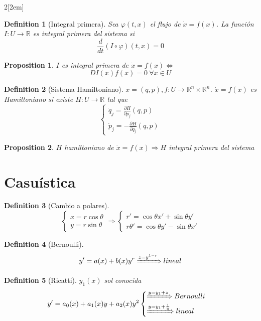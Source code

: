\documentclass[leqno]{article}
\newtheorem*{definition}{Definition}
\newtheorem*{proposition}{Proposition}
\begin{document}
\begin{multicols}{2}[\columnsep2em]
\begin{definition}[Integral primera] Sea  $\varphi (t, x)$ el flujo de $\dot{x}=f(x)$. La función $I:U\to \mathbb{R}$ es integral primera del sistema si
  \[
  \frac{d }{d t} (I \circ \varphi )(t,x) = 0
  \] 
\end{definition}

\begin{proposition}
$I$ es integral primera de $\dot{x}=f(x) \iff$
\[
DI(x)f(x) = 0 \ \forall x\in U
\] 
\end{proposition}

\begin{definition}[Sistema Hamiltoniano]
$x=(q,p), f:U\to \mathbb{R}^n\times \mathbb{R}^n$. $\dot{x} = f(x)$ es Hamiltoniano si existe $H:U\to \mathbb{R}$ tal que
\[
\begin{cases}
  \dot{q}_j = \frac{\partial H}{\partial p_j}(q,p) \\
  \dot{p}_j = -\frac{\partial H}{\partial q_j}(q,p)
\end{cases}
\] 
\end{definition}

\begin{proposition}
$H$ hamiltoniano de  $\dot{x}=f(x) \Rightarrow H$ integral primera del sistema 
\end{proposition}


\section{Casuística}
\begin{definition}[Cambio a polares]
\[
\begin{cases}
  x = r\cos\theta \\
  y = r\sin\theta 
\end{cases} \Rightarrow 
\begin{cases}
  r' = \cos\theta x' + \sin \theta y'\\
  r\theta ' = \cos \theta y' - \sin \theta x'
\end{cases}
\] 
\end{definition}

\begin{definition}[Bernoulli]
\[
y' = a(x) + b(x)y^{r} \xRightarrow{z=y^{1-r}} lineal
\] 
\end{definition}

\begin{definition}[Ricatti] $y_1(x)$ sol conocida
\[
y' = a_0(x) + a_1(x)y + a_2(x)y^2 \begin{cases}
  \xRightarrow{y = y_1+z} Bernoulli\\
  \xRightarrow{y=y_1+\frac{1}{u}} lineal
\end{cases}
\] 
\end{definition}


\end{multicols}
\end{document}
